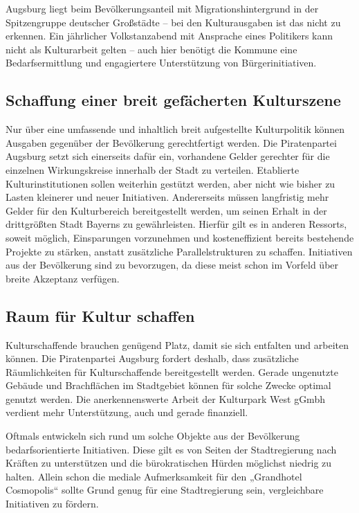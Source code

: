   Augsburg liegt beim Bevölkerungsanteil mit Migrationshintergrund in der 
  Spitzengruppe deutscher Großstädte – bei den Kulturausgaben ist das nicht 
  zu erkennen. Ein jährlicher Volkstanzabend mit Ansprache eines Politikers 
  kann nicht als Kulturarbeit gelten – auch hier benötigt die Kommune eine 
  Bedarfsermittlung und engagiertere Unterstützung von Bürgerinitiativen.
  
  \subsection{Schaffung einer breit gefächerten Kulturszene}
  
  Nur über eine umfassende und inhaltlich breit aufgestellte Kulturpolitik
  können Ausgaben gegenüber der Bevölkerung gerechtfertigt werden. Die 
  Piratenpartei Augsburg setzt sich einerseits dafür ein, vorhandene Gelder 
  gerechter für die einzelnen Wirkungskreise innerhalb der Stadt zu 
  verteilen. Etablierte Kulturinstitutionen sollen weiterhin gestützt werden, 
  aber nicht wie bisher zu Lasten kleinerer und neuer Initiativen. 
  Andererseits müssen langfristig mehr Gelder für den Kulturbereich 
  bereitgestellt werden, um seinen Erhalt in der drittgrößten Stadt Bayerns 
  zu gewährleisten. Hierfür gilt es in anderen Ressorts, soweit möglich, 
  Einsparungen vorzunehmen und kosteneffizient bereits bestehende Projekte zu 
  stärken, anstatt zusätzliche Parallelstrukturen zu schaffen. Initiativen 
  aus der Bevölkerung sind zu bevorzugen, da diese meist schon im Vorfeld 
  über breite Akzeptanz verfügen.
  
  \subsection{Raum für Kultur schaffen}
  
  Kulturschaffende brauchen genügend Platz, damit sie sich entfalten und 
  arbeiten können. Die Piratenpartei Augsburg fordert deshalb, dass 
  zusätzliche Räumlichkeiten für Kulturschaffende bereitgestellt werden. 
  Gerade ungenutzte Gebäude und Brachflächen im Stadtgebiet können für solche 
  Zwecke optimal genutzt werden. Die anerkennenswerte Arbeit der Kulturpark 
  West gGmbh verdient mehr Unterstützung, auch und gerade finanziell.
  
  Oftmals entwickeln sich rund um solche Objekte aus der Bevölkerung 
  bedarfsorientierte Initiativen. Diese gilt es von Seiten der Stadtregierung 
  nach Kräften zu unterstützen und die bürokratischen Hürden möglichst 
  niedrig zu halten. Allein schon die mediale Aufmerksamkeit für den 
  „Grandhotel Cosmopolis“ sollte Grund genug für eine Stadtregierung sein, 
  vergleichbare Initiativen zu fördern.
  
